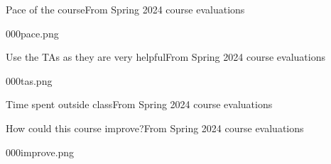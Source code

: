 \begin{frame}{Pace of the course}{From Spring 2024 course evaluations}

\Vskip{-3.5em}\begin{center}\begin{Pixture}[width=0.8\textwidth]{000}{pace.png}  
\end{Pixture}\end{center}
    
\end{frame}

\begin{frame}{Use the TAs as they are very helpful}{From Spring 2024 course evaluations}

\Vskip{-3.5em}\begin{center}\begin{Pixture}[width=0.7\textwidth]{000}{tas.png}  
\end{Pixture}\end{center}
    
\end{frame}

\begin{frame}{Time spent outside class}{From Spring 2024 course evaluations}

    
\end{frame}

\begin{frame}{How could this course improve?}{From Spring 2024 course evaluations}

\Vskip{-3.6em}\begin{center}\begin{Pixture}[width=0.84\textwidth]{000}{improve.png}  
\end{Pixture}\end{center}
    
\end{frame}

